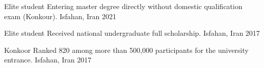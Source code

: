 



\begin{cvhonors}

  \cvhonor
    {Elite student} %
    {Entering master degree directly without domestic qualification exam (Konkour).} %
    {Isfahan, Iran} %
    {2021} %

  \cvhonor
    {Elite student} %
    {Received national undergraduate full scholarship.} %
    {Isfahan, Iran} %
    {2017} %

  \cvhonor
    {Konkoor} %
    {Ranked 820 among more than 500,000 participants for the university entrance.} %
    {Isfahan, Iran} %
    {2017} %




\end{cvhonors}




